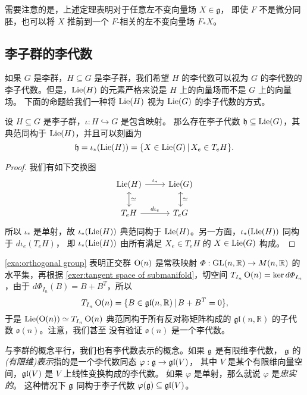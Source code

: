 需要注意的是，上述定理表明对于任意左不变向量场 $X\in \mathfrak{g}$，
即使 $F$ 不是微分同胚，也可以将 $X$ 推前到一个 $F$-相关的左不变向量场
$F_*X$。

\subsection{李子群的李代数}

如果 $G$ 是李群，$H\subseteq G$ 是李子群，我们希望 $H$
的李代数可以视为 $G$ 的李代数的李子代数。但是，$\operatorname{Lie}(H)$
的元素严格来说是 $H$ 上的向量场而不是 $G$ 上的向量场。
下面的命题给我们一种将 $\operatorname{Lie}(H)$ 视为 $\operatorname{Lie}(G)$ 的李子代数的方式。

\begin{theorem}[李子群的李代数]
  设 $H\subseteq G$ 是李子群，$\iota:H\hookrightarrow G$ 是包含映射。
  那么存在李子代数 $\mathfrak{h}\subseteq\operatorname{Lie}(G)$，其典范同构于
  $\operatorname{Lie}(H)$，并且可以刻画为
  \[
    \mathfrak{h}=\iota_*(\operatorname{Lie}(H))=\{X\in \operatorname{Lie}(G)\,|\, X_e\in T_eH\}.  
  \]
\end{theorem}
\begin{proof}
  我们有如下交换图
  \[
    \begin{tikzcd}
      \Lie(H)\arrow[r,"\iota_*"]\arrow[d,leftrightarrow,"\simeq"] & \Lie(G)\arrow[d,leftrightarrow,"\simeq"]\\
      T_eH\arrow[r,"d\iota_e"] & T_eG
    \end{tikzcd}  
  \]
  所以 $\iota_*$ 是单射，故 $\iota_*(\operatorname{Lie}(H))$ 典范同构于
  $\operatorname{Lie}(H)$。另一方面，$\iota_*(\operatorname{Lie}(H))$ 同构于 $d\iota_e(T_eH)$，
  即 $\iota_*(\operatorname{Lie}(H))$ 由所有满足 $X_e\in T_eH$ 的 $X\in\operatorname{Lie}(G)$ 构成。
\end{proof}

\begin{example}
  \autoref{exa:orthogonal group} 表明正交群 $\operatorname{O}(n)$ 是常秩映射
  $\varPhi:\operatorname{GL}(n,\mathbb{R})\to M(n,\mathbb{R})$ 的水平集，再根据
  \autoref{exer:tangent space of submanifold}，切空间
  $T_{I_n}\operatorname{O}(n)=\ker d\varPhi_{I_n}$，由于
  $d\varPhi_{I_n}(B)=B+B^T$，所以
  \[
    T_{I_n}\operatorname{O}(n)=\{B\in \mathfrak{gl}(n,\mathbb{R})\,|\, B+B^T=0\},  
  \]
  于是 $\operatorname{Lie}(\operatorname{O}(n))\simeq T_{I_n}\operatorname{O}(n)$ 典范同构于所有反对称矩阵构成的
  $\mathfrak{gl}(n,\mathbb{R})$ 的子代数 $\mathfrak{o}(n)$。注意，我们甚至
  没有验证 $\mathfrak{o}(n)$ 是一个李代数。
\end{example}

与李群的概念平行，我们也有李代数表示的概念。如果 $\mathfrak{g}$ 是有限维李代数，
$\mathfrak{g}$ 的\emph{(有限维)表示}指的是一个李代数同态 $\varphi:\mathfrak{g}\to\mathfrak{gl}(V)$，
其中 $V$ 是某个有限维向量空间，$\mathfrak{gl}(V)$ 是 $V$ 上线性变换构成的李代数。
如果 $\varphi$ 是单射，那么就说 $\varphi$ 是\emph{忠实的}。
这种情况下 $\mathfrak{g}$ 同构于李子代数 $\varphi(\mathfrak{g})\subseteq \mathfrak{gl}(V)$。

